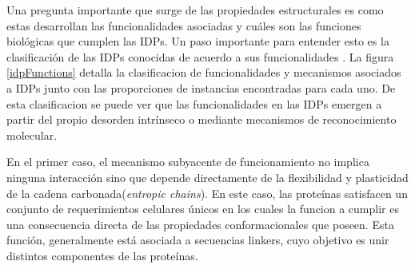 \indent Una pregunta importante que surge de las propiedades estructurales es como estas desarrollan las funcionalidades asociadas y cuáles son las funciones biológicas que cumplen las IDPs.
Un paso importante para entender esto es la clasificación de las IDPs conocidas de acuerdo a sus funcionalidades \cite{van2014classification}.
La figura \ref{idpFunctions} detalla la clasificacion de funcionalidades y mecanismos asociados a IDPs junto con las proporciones de instancias encontradas para cada uno.
De esta clasificacion se puede ver que las funcionalidades en las IDPs emergen a partir del propio desorden intrínseco o mediante mecanismos de reconocimiento molecular.

En el primer caso, el mecanismo subyacente de funcionamiento no implica ninguna interacción sino que depende directamente de la flexibilidad y plasticidad de la cadena carbonada(\textit{entropic chains}).
En este caso, las proteínas satisfacen un conjunto de requerimientos celulares únicos en los cuales la funcion a cumplir es una consecuencia directa de las propiedades conformacionales que poseen. 
Esta función, generalmente está asociada a secuencias linkers, cuyo objetivo es unir distintos componentes de las proteínas.

